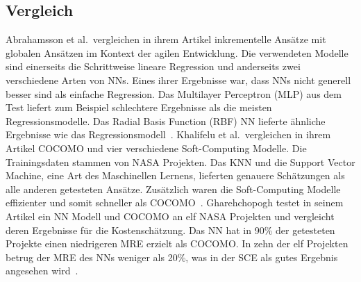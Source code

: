 \subsection{Vergleich}
Abrahamsson et al.~vergleichen in ihrem Artikel inkrementelle Ansätze mit globalen Ansätzen im Kontext der agilen Entwicklung. Die verwendeten Modelle sind einerseits die Schrittweise lineare Regression und anderseits zwei verschiedene Arten von NNs. Eines ihrer Ergebnisse war, dass NNs nicht generell besser sind als einfache Regression. Das Multilayer Perceptron (MLP) aus dem Test liefert zum Beispiel schlechtere Ergebnisse als die meisten Regressionsmodelle. Das Radial Basis Function (RBF) NN lieferte ähnliche Ergebnisse wie das Regressionsmodell~\cite{Abrahamsson2007}.
Khalifelu et al.~vergleichen in ihrem Artikel COCOMO und vier verschiedene Soft-Computing Modelle. Die Trainingsdaten stammen von NASA Projekten. Das KNN und die Support Vector Machine, eine Art des Maschinellen Lernens, lieferten genauere Schätzungen als alle anderen getesteten Ansätze. Zusätzlich waren die Soft-Computing Modelle effizienter und somit schneller als COCOMO~\cite{Khalifelu2012}.
Gharehchopogh testet in seinem Artikel ein NN Modell und COCOMO an elf NASA Projekten und vergleicht deren Ergebnisse für die Kostenschätzung. Das NN hat in 90\% der getesteten Projekte einen niedrige\-ren MRE erzielt als COCOMO. In zehn der elf Projekten betrug der MRE des NNs weniger als 20\%, was in der SCE als gutes Ergebnis angesehen wird~\cite{Gharehchopogh2011}\cite{Abrahamsson2007}.